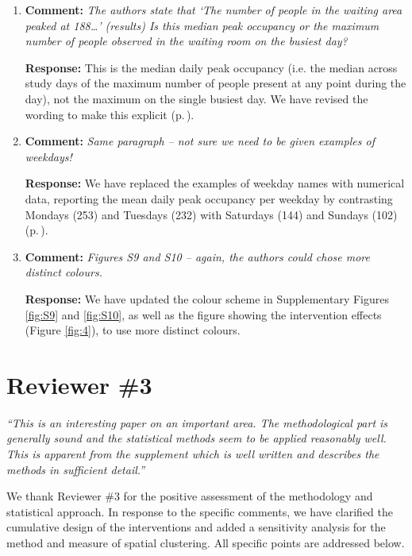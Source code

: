 \documentclass[11pt]{article}
\newcommand{\comment}[1]{\textbf{Comment:} \textit{#1}}
\newcommand{\response}[1]{\textbf{Response:} #1}
\begin{document}
\begin{enumerate}[label=\textbf{R2.\arabic*.}, leftmargin=*, start=28]
\item\label{r:2.34} \comment{The authors state that `The number of people in the waiting area peaked at 188\dots' (results) Is this median peak occupancy or the maximum number of people observed in the waiting room on the busiest day?}

\response{This is the median daily peak occupancy (i.e. the median across study days of the maximum number of people present at any point during the day), not the maximum on the single busiest day. We have revised the wording to make this explicit (p.\,\pageref{chg:R2.34}).}

\item\label{r:2.35} \comment{Same paragraph -- not sure we need to be given examples of weekdays!}

\response{We have replaced the examples of weekday names with numerical data, reporting the mean daily peak occupancy per weekday by contrasting Mondays (253) and Tuesdays (232) with Saturdays (144) and Sundays (102) (p.\,\pageref{chg:R2.35}).}

\item\label{r:2.36} \comment{Figures S9 and S10 -- again, the authors could chose more distinct colours.}

\response{We have updated the colour scheme in Supplementary Figures \ref{fig:S9} and \ref{fig:S10}, as well as the figure showing the intervention effects (Figure \ref{fig:4}), to use more distinct colours.}

\end{enumerate}

\clearpage

\section*{Reviewer \#3}

\noindent\textit{``This is an interesting paper on an important area. The methodological part is generally sound and the statistical methods seem to be applied reasonably well. This is apparent from the supplement which is well written and describes the methods in sufficient detail.''}

\medskip
\noindent We thank Reviewer \#3 for the positive assessment of the methodology and statistical approach. In response to the specific comments, we have clarified the cumulative design of the interventions and added a sensitivity analysis for the method and measure of spatial clustering. All specific points are addressed below.
\end{document}
